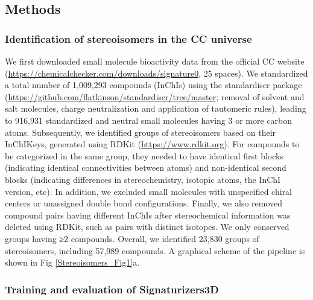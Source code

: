 \subsection{Methods}
\label{Stereoisomers_Methods}

\subsubsection{Identification of stereoisomers in the CC universe}

We first downloaded small molecule bioactivity data from the official CC website (\href{https://chemicalchecker.com/downloads/signature0}{https://chemicalchecker.com/downloads/signature0}, 25 spaces). We standardized a total number of 1,009,293 compounds (InChIs) using the standardiser package (\href{https://github.com/flatkinson/standardiser/tree/master}{https://github.com/flatkinson/standardiser/tree/master}; removal of solvent and salt molecules, charge neutralization and application of tautomeric rules), leading to 916,931 standardized and neutral small molecules having 3 or more carbon atoms. Subsequently, we identified groups of stereoisomers based on their InChIKeys\cite{heller_inchi_2015}, generated using RDKit (\href{https://www.rdkit.org}{https://www.rdkit.org}). For compounds to be categorized in the same group, they needed to have identical first blocks (indicating identical connectivities between atoms) and non-identical second blocks (indicating differences in stereochemistry, isotopic atoms, the InChI version, etc). In addition, we excluded small molecules with unspecified chiral centers or unassigned double bond configurations. Finally, we also removed compound pairs having different InChIs after stereochemical information was deleted using RDKit, such as pairs with distinct isotopes. We only conserved groups having ≥2 compounds. Overall, we identified 23,830 groups of stereoisomers, including 57,989 compounds. A graphical scheme of the pipeline is shown in Fig \ref{Stereoisomers_Fig1}a.


\subsubsection{Training and evaluation of Signaturizers3D}


